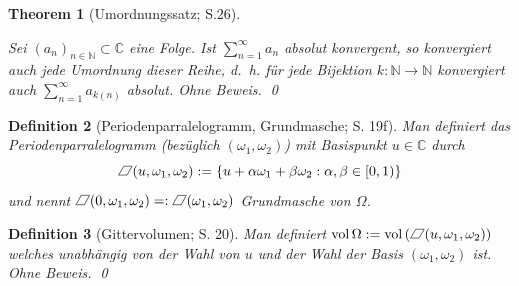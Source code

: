\documentclass[12pt]{article}
\newtheorem{theorem}{Theorem}[section]
\newtheorem{definition}[theorem]{Definition}
\numberwithin{equation}{section}
\newcommand{\kk}{\cite{kk} }
\newcommand{\vol}{\operatorname{vol}}
\newcommand*{\pa}{%
    \rlap{\rotatebox{-30}{\rule[.05ex]{.4pt}{.77em}}}%
    \kern.04em%
    \rlap{\kern.36em\raisebox{0.649519052835em}{\rule{.6em}{.4pt}}}%
    \rule{.6em}{.4pt}\kern-.04em%
    \rotatebox{-30}{\rule[.05ex]{.4pt}{.77em}}}
\newcommand{\basis}{$(\omega _1, \omega _2)$ }
\newcommand{\ohnebew}{Ohne Beweis. \qed}
\begin{document}
\begin{theorem}[Umordnungssatz; \cite{rr} S.26]\label{thm-umord}

Sei \((a_n)_{n \in \mathbb N} \subset \mathbb C\) eine Folge. Ist
\(\sum_{n=1}^\infty a_n\) absolut konvergent, so konvergiert auch jede
Umordnung dieser Reihe, d.~h. für jede Bijektion
\(k : \mathbb N \to \mathbb N\) konvergiert auch
\(\sum_{n=1}^\infty a_{k(n)}\) absolut. \ohnebew

\end{theorem}

\begin{definition}[Periodenparralelogramm, Grundmasche; \kk S. 19f]

Man definiert das Periodenparralelogramm (bezüglich
\((\omega _1, \omega _2)\)) mit Basispunkt \(u \in \mathbb C\) durch
\begin{equation}{
\pa(u, \omega _1, \omega _2) := \left\lbrace u + \alpha \omega _1 + \beta \omega _2 : \alpha, \beta  \in [0, 1) \right\rbrace
}\end{equation} und nennt
\(\pa(0, \omega_1, \omega _2) =: \pa(\omega_1, \omega _2)\) Grundmasche
von \(\Omega\).

\end{definition}

\begin{definition}[Gittervolumen; \kk S. 20]

Man definiert
\(\vol \Omega := \vol \left ( \pa(u, \omega_1, \omega _2) \right )\)
welches unabhängig von der Wahl von \(u\) und der Wahl der Basis \basis
ist. \ohnebew

\end{definition}
\end{document}

